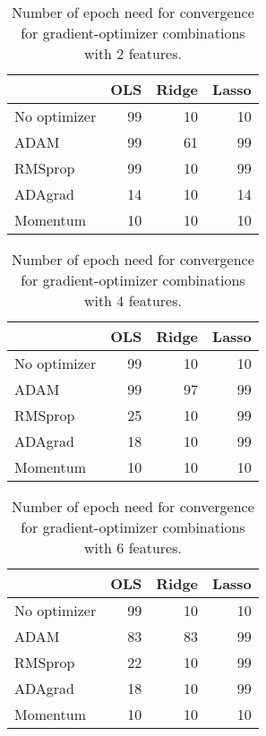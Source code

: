 
\begin{table}[H]
\centering
\caption{Number of epoch need for convergence for gradient-optimizer combinations with 2 features.}
\label{tab:final_epoch2}\begin{tabular}{lrrr}
\toprule
 & OLS   & Ridge & Lasso \\
\midrule
No optimizer & 99 & 10 & 10 \\
ADAM & 99 & 61 & 99 \\
RMSprop & 99 & 10 & 99 \\
ADAgrad & 14 & 10 & 14 \\
Momentum & 10 & 10 & 10 \\
\bottomrule
\end{tabular}
\end{table}

\begin{table}[H]
\centering
\caption{Number of epoch need for convergence for gradient-optimizer combinations with 4 features.}
\label{tab:final_epoch4}\begin{tabular}{lrrr}
\toprule
 & OLS   & Ridge & Lasso \\
\midrule
No optimizer & 99 & 10 & 10 \\
ADAM & 99 & 97 & 99 \\
RMSprop & 25 & 10 & 99 \\
ADAgrad & 18 & 10 & 99 \\
Momentum & 10 & 10 & 10 \\
\bottomrule
\end{tabular}
\end{table}

\begin{table}[H]
\centering
\caption{Number of epoch need for convergence for gradient-optimizer combinations with 6 features.}
\label{tab:final_epoch6}\begin{tabular}{lrrr}
\toprule
 & OLS   & Ridge & Lasso \\
\midrule
No optimizer & 99 & 10 & 10 \\
ADAM & 83 & 83 & 99 \\
RMSprop & 22 & 10 & 99 \\
ADAgrad & 18 & 10 & 99 \\
Momentum & 10 & 10 & 10 \\
\bottomrule
\end{tabular}
\end{table}
